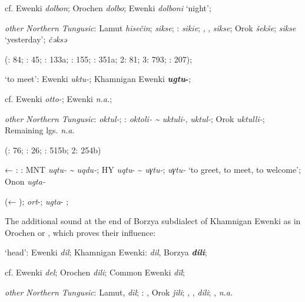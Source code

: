 \documentclass[output=paper,colorlinks,citecolor=brown]{langscibook}
\begin{document}
    cf.  Ewenki \textit{dolbon}; Orochen \textit{dolbo};  Ewenki \textit{dolboni} ‘night’;

    \textit{other Northern Tungusic}: Lamut \textit{hīsečin};  \textit{sikse}; \textit{}:  \textit{sikie}; , ,  \textit{sikse}; Orok \textit{šekše};  \textit{sikse} ‘yesterday’;  \textit{čǝksǝ}

    (\citealt{Castrén1856}: 84; \citealt{Janhunen1991}: 45; \citealt{Dorji1998}: 133a; \citealt{Chaoke2014a}: 155; \citealt{Vasilevic1958}: 351a; \citealt{Cincius1975B} 2: 81; \citealt{Hauer1952} 3: 793; \citealt{Zikmundová2013a}: 207);

    \ex ‘to meet’:  Ewenki \textit{uktu-}; Khamnigan Ewenki \textbf{\textit{ugtu}-};

    cf.  Ewenki \textit{otto-};  Ewenki \textit{n.a.};

    \textit{other Northern Tungusic}:  \textit{oktul-}; \textit{}:  \textit{oktoli- {\textasciitilde} uktuli-},  \textit{uktul-}; Orok \textit{uktulli-}; Remaining lgs. \textit{n.a}. 

    (\citealt{Castrén1856}: 76; \citealt{Janhunen1991}: 26; \citealt{Dorji1998}: 515b; \citealt{Cincius1975B} 2: 254b)

    ← : : MNT \textit{uqtu-} \textit{{\textasciitilde} uqdu-}; HY \textit{uqtu}- {\textasciitilde} \textit{uγtu-};  \textit{uγtu-} ‘to greet, to meet, to welcome’; Onon  \textit{ugta-}

    (← );  \textit{ort}-;  \textit{ugta}- \citep[139]{Khabtagaeva2017};
\z
\z

\ea
The additional sound at the end of Borzya subdialect of Khamnigan Ewenki as in Orochen or , which proves their influence:

\ea ‘head’:  Ewenki \textit{dil}; Khamnigan Ewenki:  \textit{dil}, Borzya \textbf{\textit{dili}};

    cf.  Ewenki \textit{del}; Orochen \textit{dili};  Common Ewenki \textit{dïl};

    \textit{other Northern Tungusic}: Lamut,  \textit{dil}; \textit{}: , Orok \textit{ǰili}; , ,  \textit{dili}; ,  \textit{n.a.}
    
\end{document}
